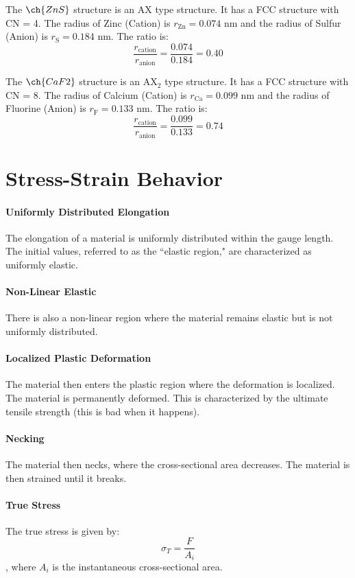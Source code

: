 \documentclass[11pt]{article}
\begin{document}
\begin{example}
    The $\ch{ZnS}$ structure is an AX type structure. It has a FCC structure with CN = 4. The radius of Zinc (Cation) is $r_{\text{Zn}} = 0.074$ nm and the radius of Sulfur (Anion) is $r_{\text{S}} = 0.184$ nm. The ratio is:
    $$ \frac{r_{\text{cation}}}{r_{\text{anion}}} = \frac{0.074}{0.184} = 0.40 $$
\end{example}
\begin{example}
    The $\ch{CaF2}$ structure is an AX$_2$ type structure. It has a FCC structure with CN = 8. The radius of Calcium (Cation) is $r_{\text{Ca}} = 0.099$ nm and the radius of Fluorine (Anion) is $r_{\text{F}} = 0.133$ nm. The ratio is:
    $$ \frac{r_{\text{cation}}}{r_{\text{anion}}} = \frac{0.099}{0.133} = 0.74 $$
\end{example}
\section{Stress-Strain Behavior}
\paragraph{Uniformly Distributed Elongation} The elongation of a material is uniformly distributed within the gauge length. The initial values, referred to as the ``elastic region," are characterized as uniformly elastic. 
\paragraph{Non-Linear Elastic} There is also a non-linear region where the material remains elastic but is not uniformly distributed.
\paragraph{Localized Plastic Deformation} The material then enters the plastic region where the deformation is localized. The material is permanently deformed. This is characterized by the ultimate tensile strength (this is bad when it happens).
\paragraph{Necking} The material then necks, where the cross-sectional area decreases. The material is then strained until it breaks.
\paragraph{True Stress} The true stress is given by:
\begin{equation}
    \sigma_T = \frac{F}{A_i}
\end{equation}
, where $A_i$ is the instantaneous cross-sectional area.
\end{document}
